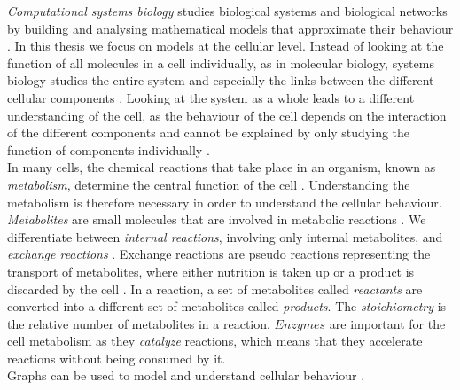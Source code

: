 \textit{Computational systems biology} studies biological systems and biological networks by building and analysing mathematical models that approximate their behaviour \cite{intro_computational_systems_biology}. In this thesis we focus on models at the cellular level.
Instead of looking at the function of all molecules in a cell individually, as in molecular biology, systems biology studies the entire system and especially the links between the different cellular components \cite{palsson_systems_biology}. 
Looking at the system as a whole leads to a different understanding of the cell, as the behaviour of the cell depends on the interaction of the different components and cannot be explained by only studying the function of components individually \cite{intro_computational_systems_biology}.\\
In many cells, the chemical reactions that take place in an organism, known as \textit{metabolism}, determine the central function of the cell \cite{intro_computational_systems_biology}. Understanding the metabolism is therefore necessary in order to understand the cellular behaviour. 
\textit{Metabolites} are small molecules that are involved in metabolic reactions \cite{intro_computational_systems_biology}. We differentiate between \textit{internal reactions}, involving only internal metabolites, and \textit{exchange reactions}%
. Exchange reactions are pseudo reactions representing the transport of metabolites, where either nutrition is taken up or a product is discarded by the cell \cite{fba_applications_and_challenges} . 
In a reaction, a set of metabolites called \textit{reactants} are converted into a different set of metabolites called \textit{products}. The \textit{stoichiometry} is the relative number of metabolites in a reaction. $Enzymes$ are important for the cell metabolism as they \textit{catalyze} reactions, which means that they accelerate reactions without being consumed by it.\\
Graphs can be used to model and understand cellular behaviour \cite{intro_computational_systems_biology}.
